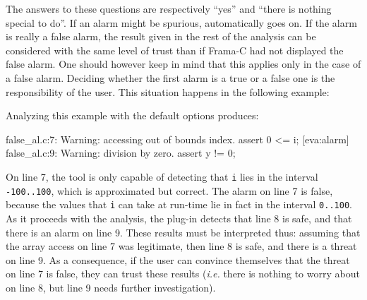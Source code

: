 \documentclass{frama-c-book}
\begin{document}
The answers to these questions are respectively ``yes'' and
``there is nothing special to do''. If an alarm might be spurious, \Eva{}
automatically goes on. If the alarm is really a
false alarm, the result given in the rest of the analysis can be
considered with the same level of trust than if Frama-C had not
displayed the false alarm. One should however keep in mind
that this applies only in
the case of a false alarm. Deciding whether the first alarm is a true
or a false one is the responsibility of the user.
This situation
happens in the following example:

Analyzing this example with the default options produces:
\begin{logs}
 false_al.c:7: Warning: accessing out of bounds index. assert 0 <= i;
[eva:alarm] false_al.c:9: Warning: division by zero. assert y != 0;
\end{logs}

On line 7, the tool is only capable of detecting that \lstinline|i| lies in
the interval \lstinline|-100..100|, which is approximated but correct.
The alarm on line 7 is false, because the values that \lstinline|i| can
take at run-time lie in fact in the interval \lstinline|0..100|. As it
proceeds with the analysis, the plug-in detects that line 8 is safe, and
that there is an alarm on line 9. These results must be interpreted
thus: assuming that the array access on line 7 was legitimate, then
line 8 is safe, and there is a threat on line 9. As a consequence, if
the user can convince themselves that the threat on line 7 is false,
they can trust these results ({\it i.e.} there is nothing to worry
about on line 8, but line 9 needs further investigation).



\end{document}
